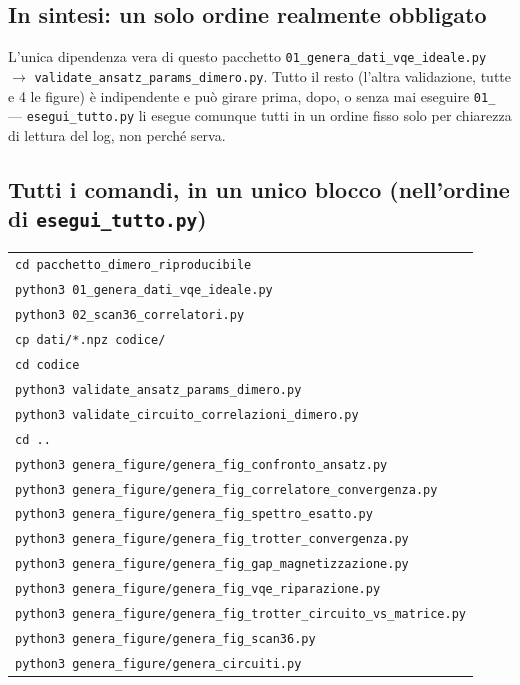 \documentclass[11pt,a4paper]{article}
\newcommand{\code}[1]{\texttt{\small #1}}
\begin{document}
\subsection{In sintesi: un solo ordine realmente obbligato}

\begin{okbox}{L'unica dipendenza vera di questo pacchetto}
\code{01\_genera\_dati\_vqe\_ideale.py} $\to$
\code{validate\_ansatz\_params\_dimero.py}. Tutto il resto (l'altra
validazione, tutte e 4 le figure) è indipendente e può girare prima,
dopo, o senza mai eseguire \code{01\_} --- \code{esegui\_tutto.py} li
esegue comunque tutti in un ordine fisso solo per chiarezza di lettura
del log, non perché serva.
\end{okbox}

\subsection{Tutti i comandi, in un unico blocco (nell'ordine di \texttt{esegui\_tutto.py})}

\begin{keyeq}
\centering
\begin{tabular}{@{}l@{}}
\code{cd pacchetto\_dimero\_riproducibile}\\
\code{python3 01\_genera\_dati\_vqe\_ideale.py}\\
\code{python3 02\_scan36\_correlatori.py}\\
\code{cp dati/*.npz codice/}\\
\code{cd codice}\\
\code{python3 validate\_ansatz\_params\_dimero.py}\\
\code{python3 validate\_circuito\_correlazioni\_dimero.py}\\
\code{cd ..}\\
\code{python3 genera\_figure/genera\_fig\_confronto\_ansatz.py}\\
\code{python3 genera\_figure/genera\_fig\_correlatore\_convergenza.py}\\
\code{python3 genera\_figure/genera\_fig\_spettro\_esatto.py}\\
\code{python3 genera\_figure/genera\_fig\_trotter\_convergenza.py}\\
\code{python3 genera\_figure/genera\_fig\_gap\_magnetizzazione.py}\\
\code{python3 genera\_figure/genera\_fig\_vqe\_riparazione.py}\\
\code{python3 genera\_figure/genera\_fig\_trotter\_circuito\_vs\_matrice.py}\\
\code{python3 genera\_figure/genera\_fig\_scan36.py}\\
\code{python3 genera\_figure/genera\_circuiti.py}\\
\end{tabular}
\end{keyeq}
\end{document}
